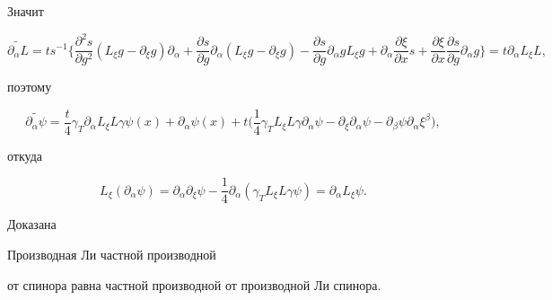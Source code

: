Значит


$$


\widetilde {\partial_\alpha L}=ts^{-1}\bigg\{


\frac{\partial^2 s}{\partial g^2}(L_\xi g-\partial_\xi g)


\partial_\alpha+


\frac{\partial s}{\partial g}\partial_\alpha (L_\xi g-\partial_\xi g)-


\frac{\partial s}{\partial g}\partial_\alpha gL_\xi g+


\partial_\alpha \frac{\partial \xi}{\partial x} s+


\frac{\partial \xi}{\partial x}


\frac{\partial s}{\partial g}\partial_\alpha g\bigg\}=t


\partial_\alpha L_\xi L,


$$


поэтому


$$


\widetilde {\partial_\alpha \psi}= \frac{t}{4}\gamma_T


\partial_\alpha L_\xi L \gamma\psi(x)+


\partial_\alpha \psi(x)+t\bigg(\frac{1}{4} \gamma_TL_\xi L\gamma


\partial_\alpha \psi-\partial_\xi\partial_\alpha\psi-


\partial_\beta\psi\partial_\alpha\xi^\beta\bigg),


$$


откуда


$$


L_\xi(\partial_\alpha\psi)=\partial_\alpha\partial_\xi\psi-


\frac{1}{4}\partial_\alpha(\gamma_TL_\xi L\gamma\psi)=


\partial_\alpha L_\xi\psi.


$$





Доказана





\begin{thm}


Производная Ли частной производной


от спинора равна частной производной от производной Ли спинора.


\end{thm}






